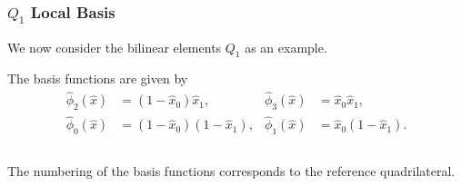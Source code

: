 \begin{frame}
\frametitle{$Q_1$ Local Basis}
We now consider the bilinear elements $Q_1$ as an example.

The basis functions are given by
\begin{align*}
\hat\phi_2(\hat{x}) &= (1-\hat{x}_0)\hat{x}_1, &
\hat\phi_3(\hat{x}) &= \hat{x}_0\hat{x}_1, \\
\hat\phi_0(\hat{x}) &= (1-\hat{x}_0)(1-\hat{x}_1), &
\hat\phi_1(\hat{x}) &= \hat{x}_0(1-\hat{x}_1).
\end{align*}

\begin{columns}
\begin{column}{0.65\textwidth}
The numbering of the basis functions corresponds to the reference
quadrilateral.
\end{column}
\end{columns}


\end{frame}
